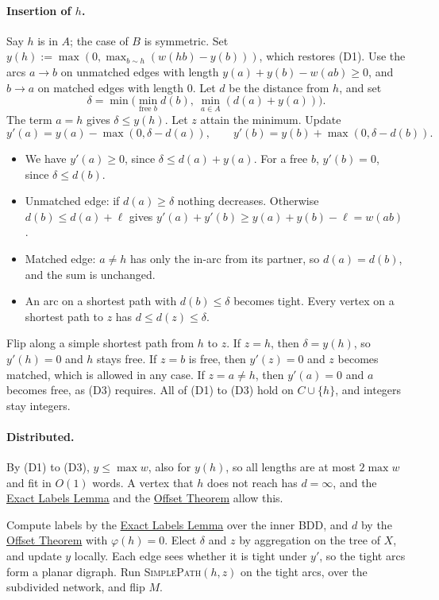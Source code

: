 \documentclass[11pt]{article}
\theoremstyle{definition}
\theoremstyle{remark}
\theoremstyle{plain}
\newcommand{\LemLabels}{\hyperref[lem:labels]{Exact Labels Lemma}}
\newcommand{\ThmOff}{\hyperref[thm:off]{Offset Theorem}}
\newcommand{\AlgPath}{\textsc{SimplePath}}
\newcommand{\AlgWeight}{\textsc{WeightedInsertHub}}
\begin{document}
\paragraph{Insertion of $h$.} Say $h$ is in $A$; the case of $B$ is symmetric. Set
$y(h):=\max(0,\max_{b\sim h}(w(hb)-y(b)))$, which restores (D1). Use the arcs $a\to b$ on unmatched edges with length
$y(a)+y(b)-w(ab)\ge0$, and $b\to a$ on matched edges with length $0$. Let $d$ be the distance from $h$, and set
\[
\delta=\min\bigl(\min_{\text{free }b}d(b),\ \min_{a\in A}(d(a)+y(a))\bigr).
\]
The term $a=h$ gives $\delta\le y(h)$. Let $z$ attain the minimum. Update
\[
y'(a)=y(a)-\max(0,\delta-d(a)),\qquad y'(b)=y(b)+\max(0,\delta-d(b)).
\]
\begin{itemize}
\item We have $y'(a)\ge0$, since $\delta\le d(a)+y(a)$. For a free $b$, $y'(b)=0$, since $\delta\le d(b)$.
\item Unmatched edge: if $d(a)\ge\delta$ nothing decreases. Otherwise $d(b)\le d(a)+\ell$ gives
$y'(a)+y'(b)\ge y(a)+y(b)-\ell=w(ab)$.
\item Matched edge: $a\ne h$ has only the in-arc from its partner, so $d(a)=d(b)$, and the sum is unchanged.
\item An arc on a shortest path with $d(b)\le\delta$ becomes tight. Every vertex on a shortest path to $z$ has $d\le d(z)\le\delta$.
\end{itemize}
Flip along a simple shortest path from $h$ to $z$. If $z=h$, then $\delta=y(h)$, so $y'(h)=0$ and $h$ stays free. If $z=b$ is free, then
$y'(z)=0$ and $z$ becomes matched, which is allowed in any case. If $z=a\ne h$, then $y'(a)=0$ and $a$ becomes free, as (D3) requires.
All of (D1) to (D3) hold on $C\cup\{h\}$, and integers stay integers.

\paragraph{Distributed.} By (D1) to (D3), $y\le\max w$, also for $y(h)$, so all lengths are at most $2\max w$ and fit in
$O(1)$ words. A vertex that $h$ does not reach has $d=\infty$, and the \LemLabels{} and the \ThmOff{} allow this.

\begin{algorithm}[t]
\caption{\AlgWeight{}, for one bag $X$ and one new vertex $h$}\label{alg:weight}
\begin{algorithmic}[1]
\State Compute labels by the \LemLabels{} over the inner BDD, and $d$ by the \ThmOff{} with $\varphi(h)=0$.
\State Elect $\delta$ and $z$ by aggregation on the tree of $X$, and update $y$ locally.
\State Each edge sees whether it is tight under $y'$, so the tight arcs form a planar digraph.
\State Run \AlgPath{}$(h,z)$ on the tight arcs, over the subdivided network, and flip $M$.
\end{algorithmic}
\end{algorithm}
\end{document}
